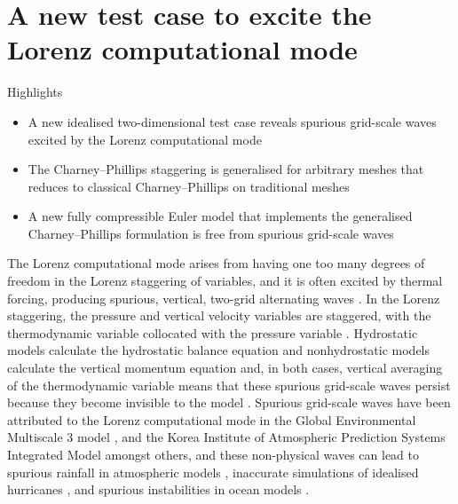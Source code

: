 \chapter{A new test case to excite the Lorenz computational mode}
\label{ch:cp}

\begin{highlights}
{\Large Highlights}
\begin{itemize}
	\item A new idealised two-dimensional test case reveals spurious grid-scale waves excited by the Lorenz computational mode
	\item The Charney--Phillips staggering is generalised for arbitrary meshes that reduces to classical Charney--Phillips on traditional meshes
	\item A new fully compressible Euler model that implements the generalised Charney--Phillips formulation is free from spurious grid-scale waves
\end{itemize}
\end{highlights}

The Lorenz computational mode arises from having one too many degrees of freedom in the Lorenz staggering of variables, and it is often excited by thermal forcing, producing spurious, vertical, two-grid alternating waves \citep{schneider1987,arakawa-konor1996}.
In the Lorenz staggering, the pressure and vertical velocity variables are staggered, with the thermodynamic variable collocated with the pressure variable \citep{lorenz1960}.
Hydrostatic models calculate the hydrostatic balance equation and nonhydrostatic models calculate the vertical momentum equation and, in both cases, vertical averaging of the thermodynamic variable means that these spurious grid-scale waves persist because they become invisible to the model \citep{arakawa-konor1996}.
Spurious grid-scale waves have been attributed to the Lorenz computational mode in the Global Environmental Multiscale 3 model \citep{girard2014}, and the Korea Institute of Atmospheric Prediction Systems Integrated Model \citep{yi-park2017} amongst others, and these non-physical waves can lead to spurious rainfall in atmospheric models \citep{hollingsworth1995}, inaccurate simulations of idealised hurricanes \citep{zhu-smith2003}, and spurious instabilities in ocean models \citep{bell-white2017}.

